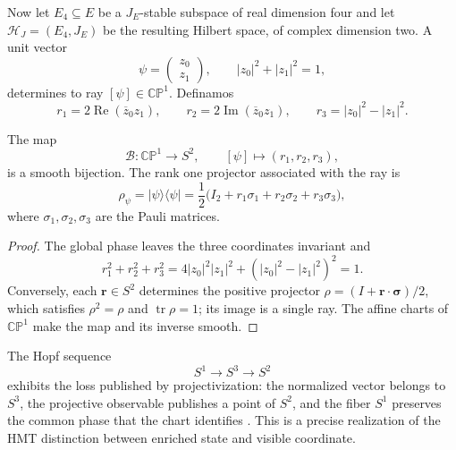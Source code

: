 Now let \(E_4\subseteq E\) be a \(J_E\)-stable subspace of real dimension
four and let \(\mathcal H_J=(E_4,J_E)\) be the resulting Hilbert space, of
complex dimension two.
A unit vector
\[
 \psi=\begin{pmatrix}z_0\\z_1\end{pmatrix},
 \qquad |z_0|^2+|z_1|^2=1,
\]
determines to ray \([\psi]\in\mathbb {CP}^{1}\). Definamos
\begin{equation}
 r_1=2\operatorname{Re}(\overline z_0z_1),
 \qquad
 r_2=2\operatorname{Im}(\overline z_0z_1),
 \qquad
 r_3=|z_0|^2-|z_1|^2.
 \label{eq:coordenadas-bloch-rev2}
\end{equation}

\begin{theorem}
\label{thm:bloch-proyectivo-rev2}
The map
\[
 \mathcal B:\mathbb {CP}^{1}\longrightarrow S^2,
 \qquad [\psi]\longmapsto(r_1,r_2,r_3),
\]
is a smooth bijection. The rank one projector associated with the ray is
\begin{equation}
 \rho_\psi=|\psi\rangle\langle\psi|
 =\frac12\bigl(I_2+r_1\sigma_1+r_2\sigma_2+r_3\sigma_3\bigr),
 \label{eq:proyector-bloch-rev2}
\end{equation}
where \(\sigma_1,\sigma_2,\sigma_3\) are the Pauli matrices.
\end{theorem}

\begin{proof}
The global phase leaves the three coordinates invariant and
\[
 r_1^2+r_2^2+r_3^2
 =4|z_0|^2|z_1|^2+(|z_0|^2-|z_1|^2)^2=1.
\]
Conversely, each \(\boldsymbol r\in S^2\) determines the positive projector
\(\rho=(I+\boldsymbol r\cdot\boldsymbol\sigma)/2\), which satisfies
\(\rho^2=\rho\) and \(\operatorname{tr}\rho=1\); its image is a single ray.
The affine charts of \(\mathbb {CP}^{1}\) make the map and its inverse
\cite{Bloch1946} smooth.
\end{proof}

The Hopf sequence
\begin{equation}
 S^1\longrightarrow S^3\longrightarrow S^2
 \label{eq:fibrado-hopf-bloch-rev2}
\end{equation}
exhibits the loss published by projectivization: the normalized vector
belongs to \(S^3\), the projective observable publishes a point of \(S^2\), and
the fiber \(S^1\) preserves the common phase that the chart identifies
\cite{Hopf1931}. This is a precise realization of the HMT distinction between
enriched state and visible coordinate.

